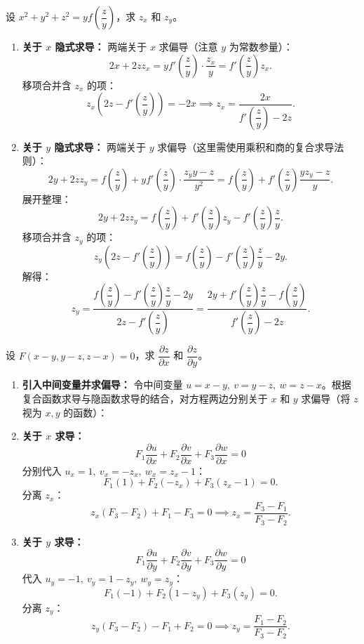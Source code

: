 \documentclass[lang=cn,11pt]{elegantbook}
\begin{document}
\begin{exercise}[抽象隐函数求导]
设 $x^2 + y^2 + z^2 = yf\left(\dfrac{z}{y}\right)$，求 $z_x$ 和 $z_y$。
\end{exercise}
\begin{solution}
\begin{enumerate}
  \item \textbf{关于 $x$ 隐式求导：}
  两端关于 $x$ 求偏导（注意 $y$ 为常数参量）：
  \[ 2x + 2z z_x = y f'\left(\frac{z}{y}\right) \cdot \frac{z_x}{y} = f'\left(\frac{z}{y}\right) z_x. \]
  移项合并含 $z_x$ 的项：
  \[ z_x\left(2z - f'\left(\frac{z}{y}\right)\right) = -2x \implies z_x = \frac{2x}{f'\left(\dfrac{z}{y}\right) - 2z}. \]

  \item \textbf{关于 $y$ 隐式求导：}
  两端关于 $y$ 求偏导（这里需使用乘积和商的复合求导法则）：
  \[ 2y + 2z z_y = f\left(\frac{z}{y}\right) + y f'\left(\frac{z}{y}\right) \cdot \frac{z_y y - z}{y^2} = f\left(\frac{z}{y}\right) + f'\left(\frac{z}{y}\right) \frac{y z_y - z}{y}. \]
  展开整理：
  \[ 2y + 2z z_y = f\left(\frac{z}{y}\right) + f'\left(\frac{z}{y}\right) z_y - f'\left(\frac{z}{y}\right)\frac{z}{y}. \]
  移项合并含 $z_y$ 的项：
  \[ z_y\left(2z - f'\left(\frac{z}{y}\right)\right) = f\left(\frac{z}{y}\right) - f'\left(\frac{z}{y}\right)\frac{z}{y} - 2y. \]
  解得：
  \[ z_y = \frac{f\left(\dfrac{z}{y}\right) - f'\left(\dfrac{z}{y}\right)\dfrac{z}{y} - 2y}{2z - f'\left(\dfrac{z}{y}\right)} = \frac{2y + f'\left(\dfrac{z}{y}\right)\dfrac{z}{y} - f\left(\dfrac{z}{y}\right)}{f'\left(\dfrac{z}{y}\right) - 2z}. \]
\end{enumerate}
\end{solution}

\begin{exercise}[抽象隐函数求导二]
设 $F(x-y, y-z, z-x) = 0$，求 $\dfrac{\partial z}{\partial x}$ 和 $\dfrac{\partial z}{\partial y}$。
\end{exercise}
\begin{solution}
\begin{enumerate}
  \item \textbf{引入中间变量并求偏导：}
  令中间变量 $u = x-y,\ v = y-z,\ w = z-x$。根据复合函数求导与隐函数求导的结合，对方程两边分别关于 $x$ 和 $y$ 求偏导（将 $z$ 视为 $x,y$ 的函数）：
  
  \item \textbf{关于 $x$ 求导：}
  \[ F_1 \frac{\partial u}{\partial x} + F_2 \frac{\partial v}{\partial x} + F_3 \frac{\partial w}{\partial x} = 0 \]
  分别代入 $u_x = 1,\ v_x = -z_x,\ w_x = z_x - 1$：
  \[ F_1(1) + F_2(-z_x) + F_3(z_x - 1) = 0. \]
  分离 $z_x$：
  \[ z_x(F_3 - F_2) + F_1 - F_3 = 0 \implies z_x = \frac{F_3 - F_1}{F_3 - F_2}. \]

  \item \textbf{关于 $y$ 求导：}
  \[ F_1 \frac{\partial u}{\partial y} + F_2 \frac{\partial v}{\partial y} + F_3 \frac{\partial w}{\partial y} = 0 \]
  代入 $u_y = -1,\ v_y = 1 - z_y,\ w_y = z_y$：
  \[ F_1(-1) + F_2(1 - z_y) + F_3(z_y) = 0. \]
  分离 $z_y$：
  \[ z_y(F_3 - F_2) - F_1 + F_2 = 0 \implies z_y = \frac{F_1 - F_2}{F_3 - F_2}. \]
\end{enumerate}
\end{solution}
\end{document}
